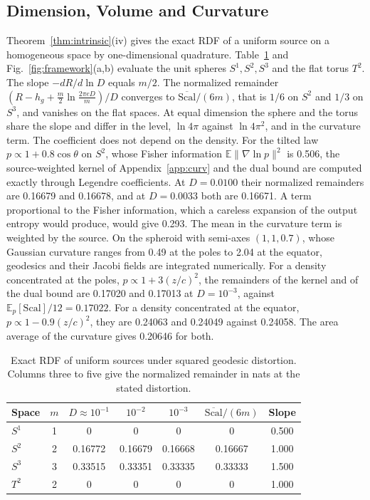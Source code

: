 \documentclass[10pt,journal]{IEEEtran}
\newcommand{\E}{\mathbb E}
\begin{document}
\subsection{Dimension, Volume and Curvature}
Theorem~\ref{thm:intrinsic}(iv) gives the exact RDF of a uniform source on a homogeneous space by one-dimensional quadrature. Table~\ref{tab:hom} and Fig.~\ref{fig:framework}(a,b) evaluate the unit spheres $S^1,S^2,S^3$ and the flat torus $T^2$. The slope $-dR/d\ln D$ equals $m/2$. The normalized remainder $(R-h_g+\frac m2\ln\frac{2\pi eD}m)/D$ converges to $\overline{\mathrm{Scal}}/(6m)$, that is $1/6$ on $S^2$ and $1/3$ on $S^3$, and vanishes on the flat spaces. At equal dimension the sphere and the torus share the slope and differ in the level, $\ln4\pi$ against $\ln4\pi^2$, and in the curvature term. The coefficient does not depend on the density. For the tilted law $p\propto1+0.8\cos\theta$ on $S^2$, whose Fisher information $\E\|\nabla\ln p\|^2$ is 0.506, the source-weighted kernel of Appendix~\ref{app:curv} and the dual bound are computed exactly through Legendre coefficients. At $D=0.0100$ their normalized remainders are 0.16679 and 0.16678, and at $D=0.0033$ both are 0.16671. A term proportional to the Fisher information, which a careless expansion of the output entropy would produce, would give 0.293. The mean in the curvature term is weighted by the source. On the spheroid with semi-axes $(1,1,0.7)$, whose Gaussian curvature ranges from 0.49 at the poles to 2.04 at the equator, geodesics and their Jacobi fields are integrated numerically. For a density concentrated at the poles, $p\propto1+3(z/c)^2$, the remainders of the kernel and of the dual bound are 0.17020 and 0.17013 at $D=10^{-3}$, against $\E_p[\mathrm{Scal}]/12=0.17022$. For a density concentrated at the equator, $p\propto1-0.9(z/c)^2$, they are 0.24063 and 0.24049 against 0.24058. The area average of the curvature gives 0.20646 for both.
\begin{table}[t]
\caption{Exact RDF of uniform sources under squared geodesic distortion. Columns three to five give the normalized remainder in nats at the stated distortion.}\label{tab:hom}\centering
\setlength{\tabcolsep}{4pt}
\begin{tabular}{lcccccc}\toprule
Space & $m$ & $D\!\approx\!10^{-1}$ & $10^{-2}$ & $10^{-3}$ & $\overline{\mathrm{Scal}}/(6m)$ & Slope\\\midrule
$S^1$ & 1 & 0 & 0 & 0 & 0 & 0.500\\
$S^2$ & 2 & 0.16772 & 0.16679 & 0.16668 & 0.16667 & 1.000\\
$S^3$ & 3 & 0.33515 & 0.33351 & 0.33335 & 0.33333 & 1.500\\
$T^2$ & 2 & 0 & 0 & 0 & 0 & 1.000\\\bottomrule
\end{tabular}\end{table}
\end{document}
